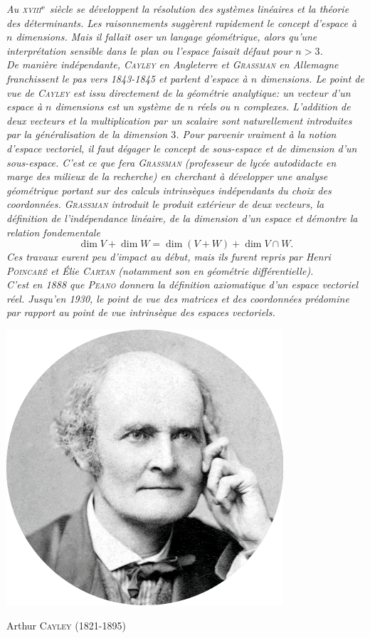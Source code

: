 \textsl{Au \textsc{xviii}$^{\mathrm{e}}$ siècle se développent la résolution des systèmes linéaires et la théorie des déterminants. Les raisonnements suggèrent rapidement le concept d'espace à $n$ dimensions. Mais il fallait oser un langage géométrique, alors qu'une interprétation sensible dans le plan ou l'espace faisait défaut pour $n > 3$. \\
De manière indépendante, \textsc{Cayley} en Angleterre et \textsc{Grassman} en Allemagne franchissent le pas vers 1843-1845 et parlent d'espace à $n$ dimensions. Le point de vue de \textsc{Cayley} est issu directement de la géométrie analytique: un vecteur d'un espace à $n$ dimensions est un système de $n$ réels ou $n$ complexes. L'addition de deux vecteurs et la multiplication par un scalaire sont naturellement introduites par la généralisation de la dimension $3$. Pour parvenir vraiment à la notion d'espace vectoriel, il faut dégager le concept de sous-espace et de dimension d'un sous-espace. C'est ce que fera \textsc{Grassman} (professeur de lycée autodidacte en marge des milieux de la recherche) en cherchant à développer une analyse géométrique portant sur des calculs intrinsèques indépendants du choix des coordonnées. \textsc{Grassman} introduit le produit extérieur de deux vecteurs, la définition de l'indépendance linéaire, de la dimension d'un espace et démontre la relation fondementale
$$\dim V + \dim W = \dim (V + W) + \dim V \cap W.$$
Ces travaux eurent peu d'impact au début, mais ils furent repris par Henri \textsc{Poincaré} et Élie \textsc{Cartan} (notamment son  en géométrie différentielle). \\
C'est en 1888 que \textsc{Peano} donnera la définition axiomatique d'un espace vectoriel réel. Jusqu'en 1930, le point de vue des matrices et des coordonnées prédomine par rapport au point de vue intrinsèque des espaces vectoriels.
}

\begin{marginfigure}[-10cm]
    \centering
    \includegraphics{images/arthur_cayley.png}
    \caption*{\centering Arthur \textsc{Cayley} (1821-1895)}
\end{marginfigure}

